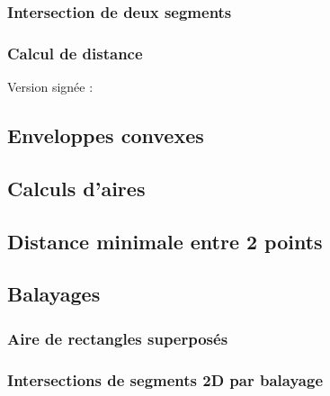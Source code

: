 \documentclass{article}
\begin{document}

\subsubsection{Intersection de deux segments}


\subsubsection{Calcul de distance}


Version signée :


\subsection{Enveloppes convexes}


\subsection{Calculs d'aires}


\subsection{Distance minimale entre 2 points}


\subsection{Balayages}
\subsubsection{Aire de rectangles superposés}


\subsubsection{Intersections de segments 2D par balayage}

\end{document}
